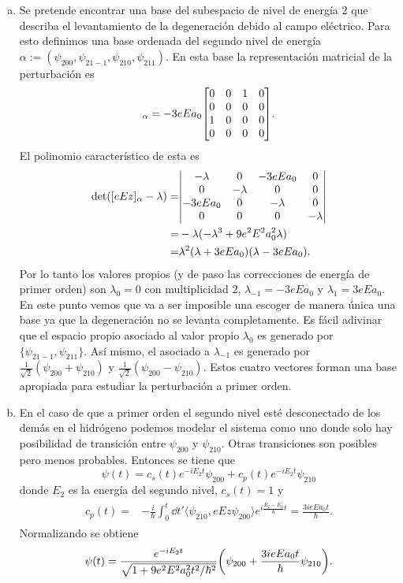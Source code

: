 \documentclass{article}
\begin{document}
\begin{enumerate}[1)]
\begin{enumerate}[a)]
\item Se pretende encontrar una base del subespacio de nivel de energía 2 que describa el levantamiento de la degeneración debido al campo eléctrico. Para esto definimos una base ordenada del segundo nivel de energía $\alpha:=(\psi_{200},\psi_{21-1},\psi_{210},\psi_{211})$. En esta base la representación matricial de la perturbación es
\begin{equation}
[eEz]_\alpha=-3eEa_0\mqty[0 & 0 & 1 & 0 \\ 0 & 0 & 0 & 0 \\ 1 & 0 & 0 & 0 \\ 0 & 0 & 0 & 0].
\end{equation}
El polinomio característico de esta es
\begin{align}
\begin{split}
\det([eEz]_\alpha - \lambda)=&\mqty|-\lambda & 0 & -3eEa_0 & 0 \\ 0 & -\lambda & 0 & 0 \\ -3eEa_0 & 0 & -\lambda & 0 \\ 0 & 0 & 0 & -\lambda|\\
=&-\lambda(-\lambda^3+9e^2E^2a_0^2\lambda)\\
=&\lambda^2(\lambda+3eEa_0)(\lambda-3eEa_0).
\end{split}
\end{align}
Por lo tanto los valores propios (y de paso las correcciones de energía de primer orden) son $\lambda_0=0$ con multiplicidad $2$, $\lambda_{-1}=-3eEa_0$ y $\lambda_1=3eEa_0$. En este punto vemos que va a ser imposible una escoger de manera única una base ya que la degeneración no se levanta completamente. Es fácil adivinar que el espacio propio asociado al valor propio $\lambda_0$ es generado por $\{\psi_{21-1},\psi_{211}\}$. Así mismo, el asociado a $\lambda_{-1}$ es generado por $\frac{1}{\sqrt{2}}(\psi_{200}+\psi_{210})$ y $\frac{1}{\sqrt{2}}(\psi_{200}-\psi_{210})$. Estos cuatro vectores forman una base apropiada para estudiar la perturbación a primer orden.

\item En el caso de que a primer orden el segundo nivel esté desconectado de los demás en el hidrógeno podemos modelar el sistema como uno donde solo hay posibilidad de transición entre $\psi_{200}$ y $\psi_{210}$. Otras transiciones son posibles pero menos probables. Entonces se tiene que
\begin{equation}
\psi(t)=c_s(t)e^{-iE_2t}\psi_{200}+c_p(t)e^{-iE_2t}\psi_{210}
\end{equation}
donde $E_2$ es la energía del segundo nivel, $c_s(t)=1$ y
\begin{align}
\begin{split}
c_p(t)=&-\frac{i}{\hbar}\int_0^t\dd{t'}\langle\psi_{210},eEz\psi_{200}\rangle e^{i\frac{E_2-E_2}{\hbar}t}=\frac{3ieEa_0t}{\hbar}.
\end{split}
\end{align}
Normalizando se obtiene
\begin{equation}
\psi(t)=\frac{e^{-iE_2 t}}{\sqrt{1+9e^2E^2a_0^2t^2/\hbar^2}}\qty(\psi_{200}+\frac{3ieEa_0t}{\hbar}\psi_{210}).
\end{equation}


\end{enumerate}
\end{enumerate}
\end{document}
